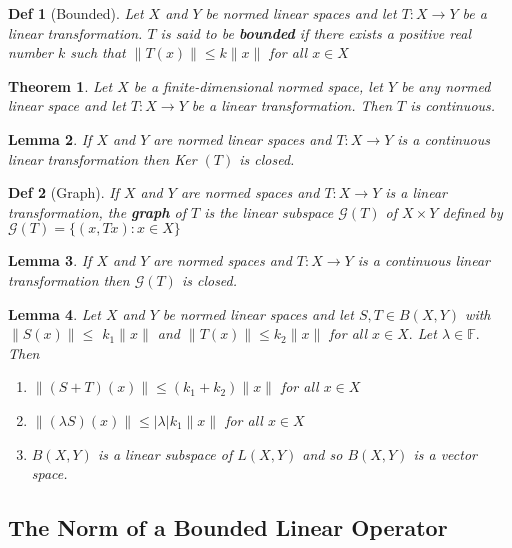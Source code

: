 \documentclass[10pt]{paper}
\newtheorem{theorem}{Theorem}[section]
\newtheorem{definition}{Def}[section]
\newtheorem{lemma}[theorem]{Lemma}
\begin{document}
\begin{definition}[Bounded]
    Let $X$ and $Y$ be normed linear spaces and let $T: X \rightarrow Y$ be a linear transformation. $T$ is said to be \textbf{bounded} if there exists a positive real number $k$ such that $\|T(x)\| \leq k\|x\|$ for all $x \in X$
\end{definition}

\begin{theorem}
    Let $X$ be a finite-dimensional normed space, let $Y$ be any normed linear space and let $T: X \rightarrow Y$ be a linear transformation. Then $T$ is continuous.
\end{theorem}

\begin{lemma}
    If $X$ and $Y$ are normed linear spaces and $T: X \rightarrow Y$ is a continuous linear transformation then Ker $(T)$ is closed.
\end{lemma}

\begin{definition}[Graph]
    If $X$ and $Y$ are normed spaces and $T: X \rightarrow Y$ is a linear transformation, the \textbf{graph} of $T$ is the linear subspace $\mathcal{G}(T)$ of $X \times Y$ defined by $\mathcal{G}(T)=\{(x, T x): x \in X\}$
\end{definition}

\begin{lemma}
    If $X$ and $Y$ are normed spaces and $T: X \rightarrow Y$ is a continuous linear transformation then $\mathcal{G}(T)$ is closed.
\end{lemma}

\begin{lemma}
    Let $X$ and $Y$ be normed linear spaces and let $S, T \in B(X, Y)$ with $\|S(x)\| \leq$ $k_{1}\|x\|$ and $\|T(x)\| \leq k_{2}\|x\|$ for all $x \in X .$ Let $\lambda \in \mathbb{F} .$ Then
    \begin{enumerate}
        \item $\|(S+T)(x)\| \leq\left(k_{1}+k_{2}\right)\|x\|$ for all $x \in X$
        \item $\|(\lambda S)(x)\| \leq|\lambda| k_{1}\|x\|$ for all $x \in X$
        \item $B(X, Y)$ is a linear subspace of $L(X, Y)$ and so $B(X, Y)$ is a vector space.
    \end{enumerate}
\end{lemma}

\subsection{The Norm of a Bounded Linear Operator}
\end{document}
